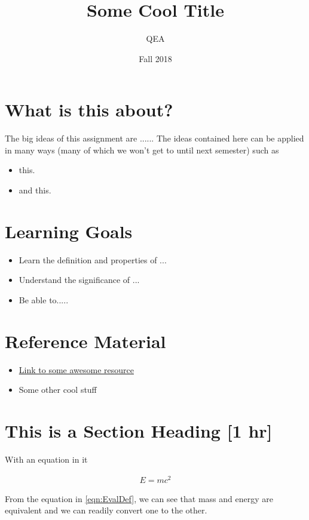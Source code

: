 \documentclass{tufte-handout}
\title{Some Cool Title}
\author{QEA}
\date{Fall 2018}
\begin{document}
\maketitle
\thispagestyle{firstpage}


\section{What is this about?}

The big ideas of this assignment are ...... The ideas contained here can be applied in many ways (many of which we won't get to until next semester) such as
\begin{itemize}
\item this.
\item and this.
\end{itemize}

\section{Learning Goals}

\begin{itemize}
\item Learn the definition and properties of ...
\item Understand the significance of ...
\item Be able to.....
\end{itemize}


\section{Reference Material}

\begin{itemize}
\item \href{https://www.youtube.com/watch?v=1kwMnB0PAVQ}{Link to some awesome resource} 
\item Some other cool stuff
\end{itemize}

\section{This is a Section Heading [1 hr]}

With an equation in it

\begin{align}
E  = mc^2 \label{eqn:EvalDef}
\end{align}

From the equation in \eqref{eqn:EvalDef},  we can see that mass and energy are equivalent and we can readily convert one to the other.
\end{document}
